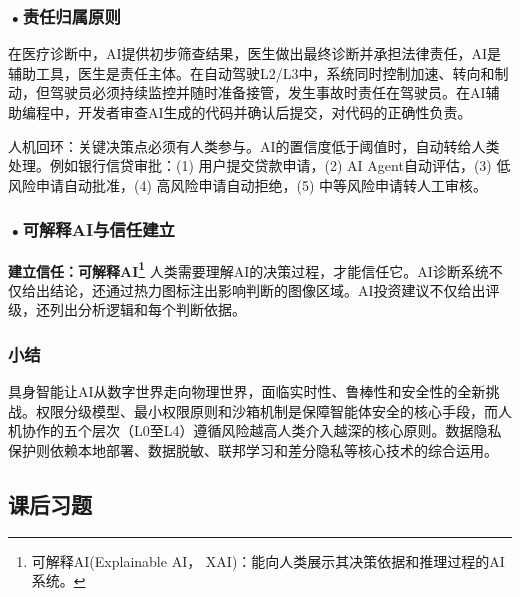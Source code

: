 \subsubsection*{\textbf{•责任归属原则}}

在医疗诊断中，AI提供初步筛查结果，医生做出最终诊断并承担法律责任，AI是辅助工具，医生是责任主体。在自动驾驶L2/L3中，系统同时控制加速、转向和制动，但驾驶员必须持续监控并随时准备接管，发生事故时责任在驾驶员。在AI辅助编程中，开发者审查AI生成的代码并确认后提交，对代码的正确性负责。

人机回环：关键决策点必须有人类参与。AI的置信度低于阈值时，自动转给人类处理。例如银行信贷审批：(1) 用户提交贷款申请，(2) AI Agent自动评估，(3) 低风险申请自动批准，(4) 高风险申请自动拒绝，(5) 中等风险申请转人工审核。


\subsubsection*{\textbf{•可解释AI与信任建立}}
\textbf{建立信任：\textbf{可解释AI}\footnote{可解释AI(Explainable AI， XAI)：能向人类展示其决策依据和推理过程的AI系统。}} 人类需要理解AI的决策过程，才能信任它。AI诊断系统不仅给出结论，还通过热力图标注出影响判断的图像区域。AI投资建议不仅给出评级，还列出分析逻辑和每个判断依据。





\subsubsection*{小结}

具身智能让AI从数字世界走向物理世界，面临实时性、鲁棒性和安全性的全新挑战。权限分级模型、最小权限原则和沙箱机制是保障智能体安全的核心手段，而人机协作的五个层次（L0至L4）遵循风险越高人类介入越深的核心原则。数据隐私保护则依赖本地部署、数据脱敏、联邦学习和差分隐私等核心技术的综合运用。


\bigskip
\subsection*{课后习题}

